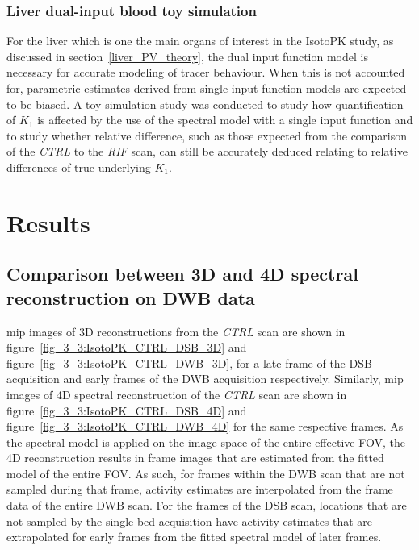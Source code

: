 \subsubsection{Liver dual-input blood toy simulation}
For the liver which is one the main organs of interest in the IsotoPK study, as discussed in section~\ref{liver_PV_theory}, the dual input function model is necessary for accurate modeling of tracer behaviour. 
When this is not accounted for, parametric estimates derived from single input function models are expected to be biased.  
A toy simulation study was conducted to study how quantification of $K_1$ is affected by the use of the spectral model with a single input function and to study whether relative difference, such as those expected from the comparison of the \textit{CTRL} to the \textit{RIF} scan, can still be accurately deduced relating to relative differences of true underlying $K_1$.


\section{Results}
\subsection{Comparison between 3D and 4D spectral reconstruction on DWB data}
\Gls{mip} images of 3D reconstructions from the \textit{CTRL} scan are shown in figure~\ref{fig_3_3:IsotoPK_CTRL_DSB_3D} and figure~\ref{fig_3_3:IsotoPK_CTRL_DWB_3D}, for a late frame of the DSB acquisition and early frames of the DWB acquisition respectively. 
Similarly, \gls{mip} images of 4D spectral reconstruction of the \textit{CTRL} scan are shown in figure~\ref{fig_3_3:IsotoPK_CTRL_DSB_4D} and figure~\ref{fig_3_3:IsotoPK_CTRL_DWB_4D} for the same respective frames. 
As the spectral model is applied on the image space of the entire effective FOV, the 4D reconstruction results in frame images that are estimated from the fitted model of the entire FOV. As such, for frames within the DWB scan that are not sampled during that frame, activity estimates are interpolated from the frame data of the entire DWB scan. For the frames of the DSB scan, locations that are not sampled by the single bed acquisition have activity estimates that are extrapolated for early frames from the fitted spectral model of later frames.

